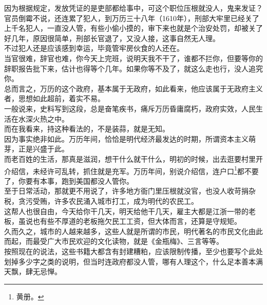 \begin{multicols}{\theparacolNo}
因为根据规定，发放凭证的是吏部都给事中，可这个职位压根就没人，鬼来发证？\\

官员倒霉不说，还连累了犯人，到万历三十八年（1610年），刑部大牢里已经关了上千名犯人，一直没人管，有些小偷小摸的，审下来也就是个治安处罚，却被关了好几年，原因很简单，刑部长官退了，又没人接，这事自然无人理。\\

不过犯人还是应该感到幸运，毕竟管牢房伙食的人还在。\\

当官很难，辞官也难，你今天上完班，说明天我不干了，谁都不拦你，但要等你的辞职报告批下来，估计也得等个几年。如果你等不及了，就这么走也行，没人追究你。\\

总而言之，万历的这个政府，基本属于无政府，如此看来，他应该属于无政府主义者，思想如此超前，着实不易。\\

一般说来，史料写到这段，总是奋笔疾书，痛斥万历昏庸腐朽，政府实效，人民生活在水深火热之中。\\

而在我看来，持这种看法的，不是装蒜，就是无知。\\

因为事实绝非如此。万历年间，恰恰是明代经济最发达的时期，所谓资本主义萌芽，正是兴盛于此。\\

而老百姓的生活，那真是滋润，想干什么就干什么，明初的时候，出去逛要村里开介绍信，未经许可乱转，抓住就是充军。万历年间，别说介绍信，连户口\footnote{黄册。}都不要了，你要有本事，跑到美国都没人管你。\\

至于日常活动，那就更不用说了，许多地方衙门里压根就没官，也没人收苛捐杂税，贪污受贿，许多农民涌入城市打工，成为明代的农民工。\\

这帮人也很自由，今天给你干几天，明天给他干几天，雇主大都是江浙一带的老板，虽说也有些不厚道的老板拖欠民工工资，但大体而言，还算是守规矩。\\

久而久之，城市的人越来越多，这些人就是所谓的市民，明代著名的市民文化由此而起，而最受广大市民欢迎的文化读物，就是《金瓶梅》、三言等等。\\

按照现在的说法，这些书籍大都含有封建糟粕，应该限制传播，至少也要写个此处划掉多少字之类的说明，但当时连政府都没人管，哪有人理这个，什么足本善本满天飘，肆无忌惮。\\


\end{multicols}
